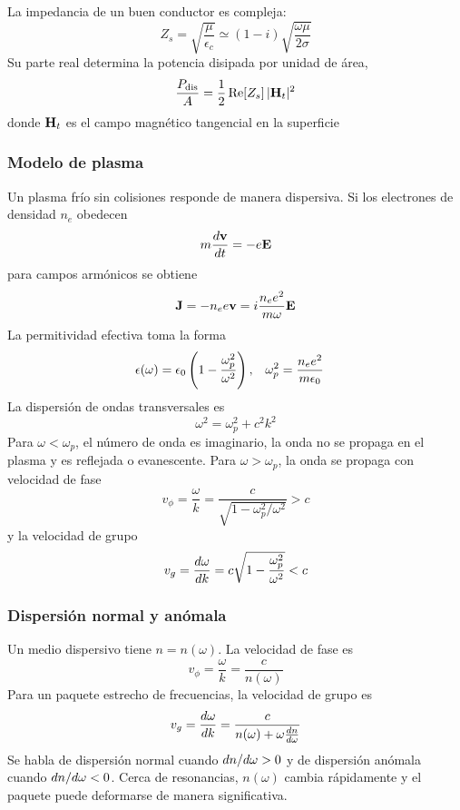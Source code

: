 \documentclass[]{article}
\numberwithin{equation}{section}
\begin{document}
La impedancia de un buen conductor es compleja:
\begin{equation}
	Z_s = \sqrt{\frac{\mu}{\epsilon_c}} \simeq (1 - i)\sqrt{\frac{\omega\mu}{2\sigma}}
\end{equation}
Su parte real determina la potencia disipada por unidad de área,
\begin{equation}
	\frac{P_\mathrm{dis}}{A} = \frac{1}{2} \, \mathrm{Re}\!\left[Z_s\right] |\mathbf{H}_t|^2
\end{equation}
donde $\mathbf{H}_t$ es el campo magnético tangencial en la superficie

\subsubsection{Modelo de plasma}
Un plasma frío sin colisiones responde de manera dispersiva. Si los electrones de densidad $n_e$ obedecen
\begin{equation*}
	m \dfrac{d \mathbf{v}}{d t} = -e \mathbf{E}
\end{equation*}
para campos armónicos se obtiene
\begin{equation*}
	\mathbf{J} = -n_e e \mathbf{v} = i \frac{n_e e^2}{m \omega} \mathbf{E}
\end{equation*}
La permitividad efectiva toma la forma
\begin{align}
	\epsilon(\omega) &= \epsilon_{0}\left(1 - \frac{\omega_p^2}{\omega^2}\right), & \omega_p^2 &= \frac{n_e e^2}{m \epsilon_{0}}
\end{align}
La dispersión de ondas transversales es
\begin{equation}
	\omega^2 = \omega_p^2 + c^2 k^2
\end{equation}
Para $\omega < \omega_p$, el número de onda es imaginario, la onda no se propaga en el plasma y es reflejada o evanescente. Para $\omega > \omega_p$, la onda se propaga con velocidad de fase
\begin{equation}
	v_\phi = \frac{\omega}{k} = \frac{c}{\sqrt{1 - \omega_p^2/\omega^2}} > c
\end{equation}
y la velocidad de grupo
\begin{equation}
	v_g = \dfrac{d \omega}{d k} = c\sqrt{1 - \frac{\omega_p^2}{\omega^2}} < c
\end{equation}

\subsubsection{Dispersión normal y anómala}
Un medio dispersivo tiene $n = n(\omega)$. La velocidad de fase es
\begin{equation}
	v_\phi = \frac{\omega}{k} = \frac{c}{n(\omega)}
\end{equation}
Para un paquete estrecho de frecuencias, la velocidad de grupo es
\begin{equation}
	v_g = \dfrac{d \omega}{d k} = \frac{c}{n(\omega) + \omega \frac{d n}{d \omega}}
\end{equation}
Se habla de dispersión normal cuando $d n/d \omega > 0$ y de dispersión anómala cuando $d n/d \omega < 0$. Cerca de resonancias, $n(\omega)$ cambia rápidamente y el paquete puede deformarse de manera significativa.
\end{document}
